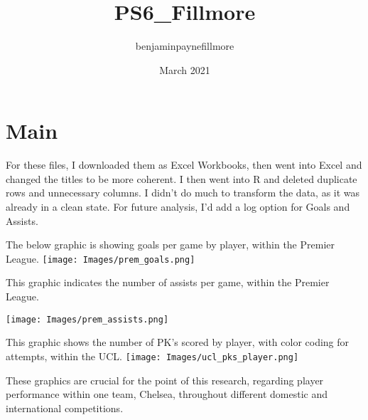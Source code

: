 \documentclass{article}
\title{PS6_Fillmore}
\author{benjaminpaynefillmore }
\date{March 2021}
\begin{document}
\graphicspath{ {./images/} }

\maketitle

\section{Main}

For these files, I downloaded them as Excel Workbooks, then went into Excel and changed the titles to be more coherent. I then went into R and deleted duplicate rows and unnecessary columns. I didn't do much to transform the data, as it was already in a clean state. For future analysis, I'd add a log option for Goals and Assists.

The below graphic is showing goals per game by player, within the Premier League.
\texttt{[image: Images/prem\_goals.png]}

This graphic indicates the number of assists per game, within the Premier League.

\texttt{[image: Images/prem\_assists.png]}

This graphic shows the number of PK's scored by player, with color coding for attempts, within the UCL.
\texttt{[image: Images/ucl\_pks\_player.png]}

These graphics are crucial for the point of this research, regarding player performance within one team, Chelsea, throughout different domestic and international competitions.
\end{document}
